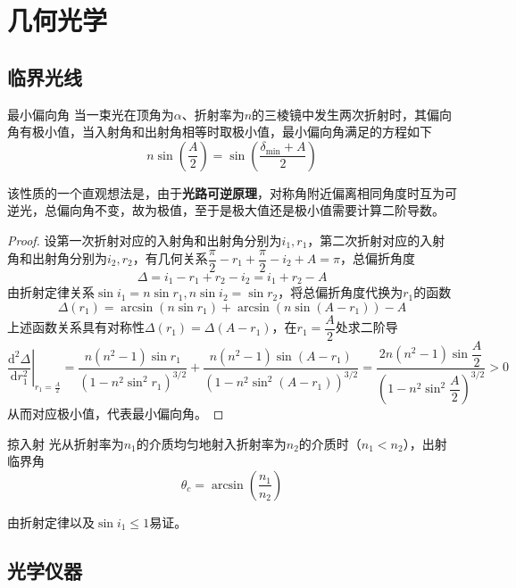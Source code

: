 \chapter{几何光学}





\section{临界光线}

\begin{myprop}{ 最小偏向角}{}
	当一束光在顶角为$\alpha$、折射率为$n$的三棱镜中发生两次折射时，其偏向角有极小值，当入射角和出射角相等时取极小值，最小偏向角满足的方程如下
    \[
        n\sin\left(\dfrac{A}{2}\right)=\sin\left(\dfrac{\delta_{\min}+A}{2}\right)
    \]
\end{myprop}
该性质的一个直观想法是，由于\textbf{光路可逆原理}，对称角附近偏离相同角度时互为可逆光，总偏向角不变，故为极值，至于是极大值还是极小值需要计算二阶导数。
\begin{proof}
    设第一次折射对应的入射角和出射角分别为$i_1,r_1$，第二次折射对应的入射角和出射角分别为$i_2,r_2$，有几何关系$\dfrac{\pi}{2}-r_1+\dfrac
    {\pi}{2}-i_2+A=\pi$，总偏折角度
    \[
        \Delta = i_1-r_1+r_2-i_2=i_1+r_2-A
    \]
    由折射定律关系$\sin i_1=n\sin r_1,n\sin i_2=\sin r_2$，将总偏折角度代换为$r_1$的函数
    \[
        \Delta(r_1)=\arcsin(n\sin r_1)+\arcsin(n\sin (A-r_1))-A    
    \]
    上述函数关系具有对称性$\Delta(r_1)=\Delta(A-r_1)$，在$r_1=\dfrac{A}{2}$处求二阶导
    \[
        \left.\dfrac{\mathrm{d}^2\Delta}{\mathrm{d}r_1^2}\right|_{r_1=\frac{A}{2}}=\frac{n \left(n^2-1\right) \sin r_1}{\left(1-n^2 \sin ^2 r_1\right)^{3/2}}+\frac{n \left(n^2-1\right) \sin (A-r_1)}{\left(1-n^2 \sin ^2 (A-r_1)\right)^{3/2}}=\frac{2n \left(n^2-1\right) \sin \dfrac{A}{2}}{\left(1-n^2 \sin ^2 \dfrac{A}{2}\right)^{3/2}}>0
    \]
    从而对应极小值，代表最小偏向角。
\end{proof}

\begin{myprop}{ 掠入射}{}
	光从折射率为$n_1$的介质均匀地射入折射率为$n_2$的介质时（$n_1<n_2$），出射临界角
    \[
        \theta_{c}=\arcsin\left(\dfrac{n_1}{n_2}\right)
    \]
\end{myprop}
由折射定律以及$\sin i_1\leq 1$易证。
\section{光学仪器}

